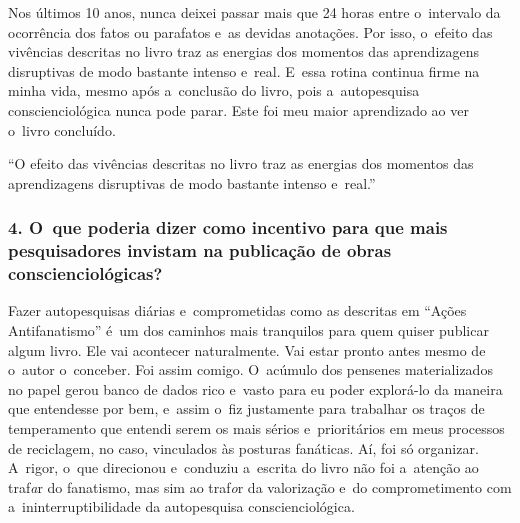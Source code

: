 \documentclass{gescons}
\begin{document}
\begin{multicols}{2}
Nos últimos 10 anos, nunca deixei passar mais que 24 horas entre o~intervalo da ocorrência dos fatos ou parafatos e~as devidas anotações. Por isso, o~efeito das vivências descritas no livro traz as energias dos momentos das aprendizagens disruptivas de modo bastante intenso e~real. E~essa rotina continua firme na minha vida, mesmo após a~conclusão do livro, pois a~autopesquisa conscienciológica nunca pode parar. Este foi meu maior aprendizado ao ver o~livro concluído.

\begin{pullquote}
``O efeito das vivências descritas no livro traz as energias dos momentos das aprendizagens disruptivas de modo bastante intenso e~real.''
\end{pullquote}


\subsubsection{4.       O~que poderia dizer como incentivo para que mais pesquisadores invistam na publicação de obras conscienciológicas?}

Fazer autopesquisas diárias e~comprometidas como as descritas em “Ações Antifanatismo” é~um dos caminhos mais tranquilos para quem quiser publicar algum livro. Ele vai acontecer naturalmente. Vai estar pronto antes mesmo de o~autor o~conceber. Foi assim comigo. O~acúmulo dos pensenes materializados no papel gerou banco de dados rico e~vasto para eu poder explorá-lo da maneira que entendesse por bem, e~assim o~fiz justamente para trabalhar os traços de temperamento que entendi serem os mais sérios e~prioritários em meus processos de reciclagem, no caso, vinculados às posturas fanáticas. Aí, foi só organizar. A~rigor, o~que direcionou e~conduziu a~escrita do livro não foi a~atenção ao traf\textit{a}r do fanatismo, mas sim ao traf\textit{o}r da valorização e~do comprometimento com a~ininterruptibilidade da autopesquisa conscienciológica.


    
    
    \end{multicols}
\end{document}
